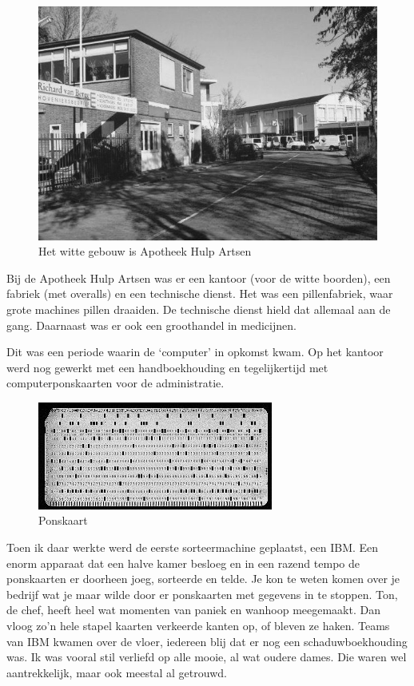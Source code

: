 \documentclass[12pt,twoside, openright]{memoir}
\begin{document}
\begin{figure}
\centering
\includegraphics[width=\textwidth]{img/207AHA}
\caption*{\footnotesize Het witte gebouw is Apotheek Hulp Artsen}
\end{figure}

Bij de Apotheek Hulp Artsen was er een kantoor (voor de witte boorden), een fabriek (met overalls) en een technische dienst. Het was een pillenfabriek, waar grote machines pillen draaiden. De technische dienst hield dat allemaal aan de gang. Daarnaast was er ook een groothandel in medicijnen. 

Dit was een periode waarin de `computer' in opkomst kwam. Op het kantoor werd nog gewerkt met een handboekhouding en tegelijkertijd met computerponskaarten voor de administratie. 

\begin{figure}
\centering
\includegraphics[width=\textwidth]{img/208ponskaart}
\caption*{\footnotesize Ponskaart}
\end{figure}

Toen ik daar werkte werd de eerste sorteermachine geplaatst, een IBM. Een enorm apparaat dat een halve kamer besloeg en in een razend tempo de ponskaarten er doorheen joeg, sorteerde en telde. Je kon te weten komen over je bedrijf wat je maar wilde  door er ponskaarten met gegevens in te stoppen. Ton, de chef, heeft heel wat momenten van paniek en wanhoop meegemaakt. Dan vloog zo’n hele stapel kaarten verkeerde kanten op, of bleven ze haken. Teams van IBM kwamen over de vloer, iedereen blij dat er nog een schaduwboekhouding was. Ik was vooral stil verliefd op alle mooie, al wat oudere dames. Die waren wel aantrekkelijk, maar ook meestal al getrouwd. 
\end{document}
